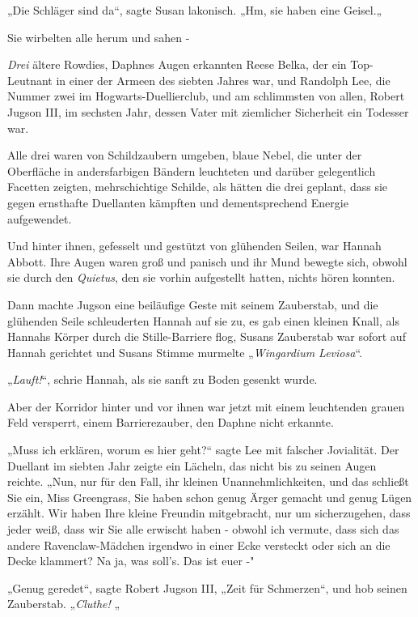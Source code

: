 {„Die Schläger sind da“, sagte Susan lakonisch. „Hm, sie haben eine Geisel.„

Sie wirbelten alle herum und sahen -

\emph{Drei} ältere Rowdies, Daphnes Augen erkannten Reese Belka, der ein Top-Leutnant in einer der Armeen des siebten Jahres war, und Randolph Lee, die Nummer zwei im Hogwarts-Duellierclub, und am schlimmsten von allen, Robert Jugson III, im sechsten Jahr, dessen Vater mit ziemlicher Sicherheit ein Todesser war.

Alle drei waren von Schildzaubern umgeben, blaue Nebel, die unter der Oberfläche in andersfarbigen Bändern leuchteten und darüber gelegentlich Facetten zeigten, mehrschichtige Schilde, als hätten die drei geplant, dass sie gegen ernsthafte Duellanten kämpften und dementsprechend Energie aufgewendet.

Und hinter ihnen, gefesselt und gestützt von glühenden Seilen, war Hannah Abbott. Ihre Augen waren groß und panisch und ihr Mund bewegte sich, obwohl sie durch den \emph{Quietus}, den sie vorhin aufgestellt hatten, nichts hören konnten.

Dann machte Jugson eine beiläufige Geste mit seinem Zauberstab, und die glühenden Seile schleuderten Hannah auf sie zu, es gab einen kleinen Knall, als Hannahs Körper durch die Stille-Barriere flog, Susans Zauberstab war sofort auf Hannah gerichtet und Susans Stimme murmelte „\emph{Wingardium Leviosa}“.

„\emph{Lauft!}“, schrie Hannah, als sie sanft zu Boden gesenkt wurde.

Aber der Korridor hinter und vor ihnen war jetzt mit einem leuchtenden grauen Feld versperrt, einem Barrierezauber, den Daphne nicht erkannte.

„Muss ich erklären, worum es hier geht?“ sagte Lee mit falscher Jovialität. Der Duellant im siebten Jahr zeigte ein Lächeln, das nicht bis zu seinen Augen reichte. „Nun, nur für den Fall, ihr kleinen Unannehmlichkeiten, und das schließt Sie ein, Miss Greengrass, Sie haben schon genug Ärger gemacht und genug Lügen erzählt. Wir haben Ihre kleine Freundin mitgebracht, nur um sicherzugehen, dass jeder weiß, dass wir Sie alle erwischt haben - obwohl ich vermute, dass sich das andere Ravenclaw-Mädchen irgendwo in einer Ecke versteckt oder sich an die Decke klammert? Na ja, was soll's. Das ist euer -"

„Genug geredet“, sagte Robert Jugson III, „Zeit für Schmerzen“, und hob seinen Zauberstab. „\emph{Cluthe!} „

}
